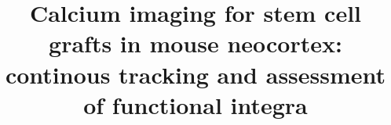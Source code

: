 \title{Calcium imaging for stem cell grafts in mouse neocortex: continous tracking and assessment of functional integra}